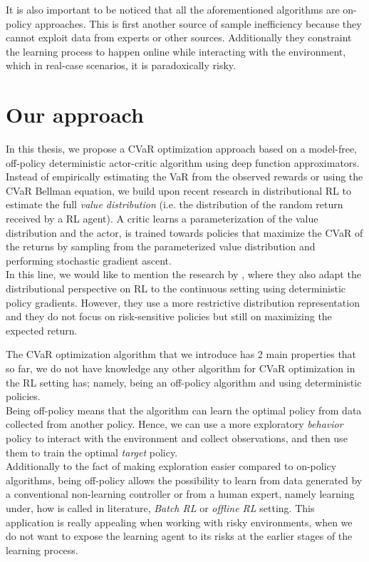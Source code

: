 It is also important to be noticed that all the aforementioned algorithms are on-policy approaches.
This is first another source of sample inefficiency
because they cannot exploit data from experts or other sources. Additionally they
constraint the learning process to happen online while interacting with the environment,
which in real-case scenarios, it is paradoxically risky.


\section{Our approach}

In this thesis, we propose a CVaR optimization approach based on a model-free, off-policy
deterministic actor-critic algorithm using deep function approximators. 
Instead of empirically estimating the VaR from the observed rewards or using the CVaR
Bellman equation, we build upon recent research in distributional RL 
\citep{Bellemare2017,Dabney2018a,Dabney2018b}
to estimate the full
\textit{value distribution} (i.e. the distribution of the random return received by a RL agent).
A critic learns a parameterization of the value distribution and 
the actor, is trained towards policies that maximize the CVaR of the returns 
by sampling from the parameterized value distribution and performing stochastic gradient ascent.\\
In this line, we would like to mention the research by \citet{BarthMaron2018}, where they also adapt
the distributional perspective on RL to the continuous setting using deterministic policy gradients.
However, they use a more restrictive distribution representation and they do not focus on risk-sensitive
policies but still on maximizing the expected return.


The CVaR optimization algorithm that we introduce has 2 main properties that so far,
we do not have knowledge any other algorithm for CVaR optimization in the RL setting has; 
namely, being an off-policy algorithm and using deterministic policies.\\
Being off-policy means that the algorithm can learn the optimal policy from data collected
from another policy. Hence, we can use a more exploratory \textit{behavior} policy to interact
with the environment and collect observations, and then use them to train
the optimal \textit{target} policy. \\
Additionally to the fact of making exploration easier compared to on-policy algorithms,
being off-policy allows the possibility to learn from data generated by a conventional
non-learning controller or from a human expert, namely learning under, how is called in
literature, \textit{Batch RL} or \textit{offline RL} setting.
This application is really appealing when working with risky environments, when we do
not want to expose the learning agent to its risks at the earlier stages of the learning
process.

